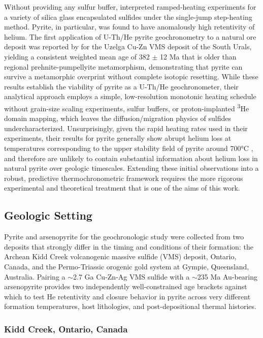 Without providing any sulfur buffer, \citet{yakubovich2019}
interpreted ramped-heating experiments for a variety of silica glass
encapsulated sulfides under the single-jump step-heating method. Pyrite,
in particular, was found to have anomalously high retentivity of helium. 
The first application of U-Th/He pyrite geochronometry to a natural ore
deposit was reported by \citet{yakubovich2019,yakubovich2020} for the Uzelga
Cu-Zn VMS deposit of the South Urals, yielding a consistent weighted
mean age of 382 $\pm$ 12 Ma that is older than regional prehnite-pumpellyite
metamorphism, demonstrating that pyrite can survive a metamorphic
overprint without complete isotopic resetting. While these results
establish the viability of pyrite as a U-Th/He geochronometer, their
analytical approach employs a simple, low-resolution monotonic heating schedule without
grain-size scaling experiments, sulfur buffers, or proton-implanted \textsuperscript{3}He
domain mapping, which leaves the diffusion/migration physics of sulfides
undercharacterized. Unsurprisingly, given the rapid heating rates used in their experiments, 
their results for pyrite generally show abrupt helium loss at temperatures corresponding to the upper stability 
field of pyrite around 700°C \citep{toulminbarton1964}, and therefore are unlikely to contain substantial information about helium loss 
in natural pyrite over geologic timescales. Extending these initial observations into a robust, predictive thermochronometric framework requires the more
rigorous experimental and theoretical treatment that is one of the aims of this work. 

\subsection{Geologic Setting}
\label{sec:ch3-geologic-setting}

Pyrite and arsenopyrite for the geochronologic study were collected from two deposits that strongly 
differ in the timing and conditions of their formation: the Archean Kidd Creek volcanogenic massive sulfide (VMS)
deposit, Ontario, Canada, and the Permo-Triassic orogenic gold system at
Gympie, Queensland, Australia. Pairing a $\sim$2.7 Ga Cu-Zn-Ag VMS sulfide
with a $\sim$235 Ma Au-bearing arsenopyrite provides two independently
well-constrained age brackets against which to test He retentivity and
closure behavior in pyrite across very different formation temperatures,
host lithologies, and post-depositional thermal histories.

\subsubsection{Kidd Creek, Ontario, Canada}

